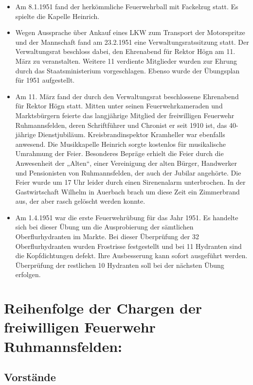 \documentclass[12pt,a4paper]{book}
\begin{document}
\begin{itemize}
\item Am 8.1.1951 fand der herkömmliche Feuerwehrball mit Fackelzug statt. Es
spielte die Kapelle Heinrich.

\item Wegen Aussprache über Ankauf eines LKW zum Transport der Motorspritze und
der Mannschaft fand am 23.2.1951 eine Verwaltungsratssitzung statt. Der
Verwaltungsrat beschloss dabei, den Ehrenabend für Rektor Högn am 11. März zu
veranstalten. Weitere 11 verdiente Mitglieder wurden zur Ehrung durch das
Staatsministerium vorgeschlagen. Ebenso wurde der Übungsplan für 1951
aufgestellt.

\item Am 11. März fand der durch den Verwaltungsrat beschlossene Ehrenabend für
Rektor Högn statt. Mitten unter seinen Feuerwehrkameraden und Marktsbürgern
feierte das langjährige Mitglied der freiwilligen Feuerwehr Ruhmannsfelden,
deren Schriftführer und Chronist er seit 1910 ist, das 40-jährige
Dienstjubiläum. Kreisbrandinspektor Kramheller war ebenfalls anwesend. Die
Musikkapelle Heinrich sorgte kostenlos für musikalische Umrahmung der Feier.
Besonderes Bepräge erhielt die Feier durch die Anwesenheit der „Alten“, einer
Vereinigung der alten Bürger, Handwerker und Pensionisten von Ruhmannsfelden,
der auch der Jubilar angehörte. Die Feier wurde um 17 Uhr leider durch einen
Sirenenalarm unterbrochen. In der Gastwirtschaft Wilhelm in Auerbach brach um
diese Zeit ein Zimmerbrand aus, der aber rasch gelöscht werden konnte.

\item Am 1.4.1951 war die erste Feuerwehrübung für das Jahr 1951. Es handelte
sich bei dieser Übung um die Ausprobierung der sämtlichen Oberflurhydranten im
Markte. Bei dieser Überprüfung der 32 Oberflurhydranten wurden Frostrisse
festgestellt und bei 11 Hydranten sind die Kopfdichtungen defekt. Ihre
Ausbesserung kann sofort ausgeführt werden. Überprüfung der restlichen 10
Hydranten soll bei der nächsten Übung erfolgen.
\end{itemize}

\chapter[Reihenfolge der Chargen]{Reihenfolge der Chargen der freiwilligen
Feuerwehr Ruhmannsfelden:}

\section*{Vorstände}
\end{document}
